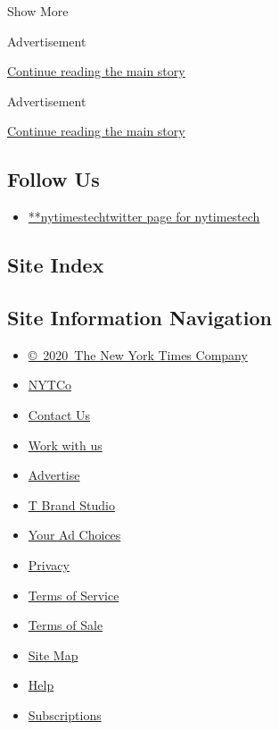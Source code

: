 Show More

Advertisement

\protect\hyperlink{after-mid2}{Continue reading the main story}

Advertisement

\protect\hyperlink{after-mktg}{Continue reading the main story}

\hypertarget{follow-us}{%
\subsection{Follow Us}\label{follow-us}}

\begin{itemize}
\tightlist
\item
  \href{https://twitter.com/nytimestech}{**nytimestechtwitter page for
  nytimestech}
\end{itemize}

\hypertarget{site-index}{%
\subsection{Site Index}\label{site-index}}

\hypertarget{site-information-navigation}{%
\subsection{Site Information
Navigation}\label{site-information-navigation}}

\begin{itemize}
\tightlist
\item
  \href{https://help.nytimes.com/hc/en-us/articles/115014792127-Copyright-notice}{©~2020~The
  New York Times Company}
\end{itemize}

\begin{itemize}
\tightlist
\item
  \href{https://www.nytco.com/}{NYTCo}
\item
  \href{https://help.nytimes.com/hc/en-us/articles/115015385887-Contact-Us}{Contact
  Us}
\item
  \href{https://www.nytco.com/careers/}{Work with us}
\item
  \href{https://nytmediakit.com/}{Advertise}
\item
  \href{http://www.tbrandstudio.com/}{T Brand Studio}
\item
  \href{https://www.nytimes.com/privacy/cookie-policy\#how-do-i-manage-trackers}{Your
  Ad Choices}
\item
  \href{https://www.nytimes.com/privacy}{Privacy}
\item
  \href{https://help.nytimes.com/hc/en-us/articles/115014893428-Terms-of-service}{Terms
  of Service}
\item
  \href{https://help.nytimes.com/hc/en-us/articles/115014893968-Terms-of-sale}{Terms
  of Sale}
\item
  \href{https://spiderbites.nytimes.com}{Site Map}
\item
  \href{https://help.nytimes.com/hc/en-us}{Help}
\item
  \href{https://www.nytimes.com/subscription?campaignId=37WXW}{Subscriptions}
\end{itemize}
